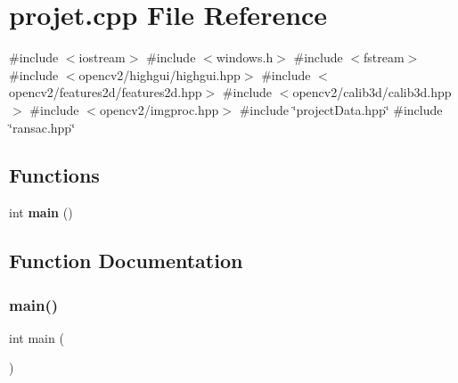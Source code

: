 \section{projet.\+cpp File Reference}
\label{projet_8cpp}
{\ttfamily \#include $<$iostream$>$}\newline
{\ttfamily \#include $<$windows.\+h$>$}\newline
{\ttfamily \#include $<$fstream$>$}\newline
{\ttfamily \#include $<$opencv2/highgui/highgui.\+hpp$>$}\newline
{\ttfamily \#include $<$opencv2/features2d/features2d.\+hpp$>$}\newline
{\ttfamily \#include $<$opencv2/calib3d/calib3d.\+hpp$>$}\newline
{\ttfamily \#include $<$opencv2/imgproc.\+hpp$>$}\newline
{\ttfamily \#include \char`\"{}project\+Data.\+hpp\char`\"{}}\newline
{\ttfamily \#include \char`\"{}ransac.\+hpp\char`\"{}}\newline
\subsection*{Functions}
\begin{DoxyCompactItemize}
\item 
int \textbf{ main} ()
\end{DoxyCompactItemize}


\subsection{Function Documentation}
\mbox{\label{projet_8cpp_ae66f6b31b5ad750f1fe042a706a4e3d4}} 
\subsubsection{main()}
{\footnotesize\ttfamily int main (\begin{DoxyParamCaption}{ }\end{DoxyParamCaption})}

